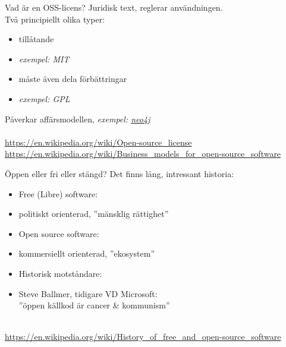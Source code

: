 \documentclass{simpleslides}
\begin{document}
\begin{Slide}{Vad är en OSS-licens?}
Juridisk text, reglerar användningen.\\Två principiellt olika typer: 
  \begin{itemize}
    \item tillåtande \hfill {}
    \item [] \emph{exempel: MIT}
    \item måste även dela förbättringar \hfill {}
    \item [] \emph{exempel: GPL}
  \end{itemize}
  Påverkar affärsmodellen, \emph{exempel: \href{https://sv.wikipedia.org/wiki/Neo4j}{neo4j}}\\
{\fontsize{8}{10}\selectfont ~\\
\href{https://en.wikipedia.org/wiki/Open-source_license}{https://en.wikipedia.org/wiki/Open-source\_license} \\
\href{https://en.wikipedia.org/wiki/Business_models_for_open-source_software}{https://en.wikipedia.org/wiki/Business\_models\_for\_open-source\_software}
}
\end{Slide}

\begin{Slide}{Öppen eller fri eller stängd?}
Det finns lång, intressant historia: 
  \begin{itemize}
    \item Free (Libre) software:
    \item[] politiskt orienterad, ''mänsklig rättighet'' 
    \item Open source software:
    \item[] kommersiellt orienterad, ''ekosystem''
    \item Historisk motståndare:
    \item[] Steve Ballmer, tidigare VD Microsoft: \\ ''öppen källkod är cancer \& kommunism''  
  \end{itemize}
  {\fontsize{8}{10}\selectfont ~\\
\href{https://en.wikipedia.org/wiki/History_of_free_and_open-source_software}{https://en.wikipedia.org/wiki/History\_of\_free\_and\_open-source\_software} \\
}
\end{Slide}
\end{document}
